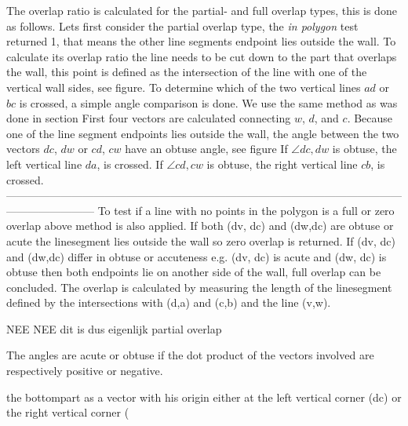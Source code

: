 \documentclass[10pt]{article}
\begin{document}
	The overlap ratio is calculated for the partial- and full overlap types, this is done as follows. 
	Lets first consider the partial overlap type, the \emph{in polygon} test returned 1, that means the other line segments endpoint lies outside the wall.
	To calculate its overlap ratio the line needs to be cut down to the part that overlaps the wall, this point is defined as the intersection of the line with one of the vertical wall sides, see figure. %
	To determine which of the two vertical lines $ad$ or $bc$ is crossed, a simple angle comparison is done.
	We use the same method as was done in section %
	First four vectors are calculated connecting $w$, $d$, and $c$.
	Because one of the line segment endpoints lies outside the wall, the angle between the two vectors $dc$, $dw$ or $cd$, $cw$ have an obtuse angle, see figure %
	If $\angle dc, dw$ is obtuse, the left vertical line $da$, is crossed. 
	If $\angle cd, cw$ is obtuse, the right vertical line $cb$, is crossed. 
------------------------------------------------------------------------------------------------------------------------------------
	To test if a line with no points in the polygon is a full or zero overlap above method is also applied.
	If both (dv, dc) and (dw,dc) are obtuse or acute the linesegment lies outside the wall so zero overlap is returned.
	If (dv, dc) and (dw,dc) differ in obtuse or accuteness e.g. (dv, dc) is acute and (dw, dc) is obtuse then 
	both endpoints lie on another side of the wall, full overlap can be concluded.
	The overlap is calculated by measuring the length of the linesegment defined by the intersections with (d,a) and (c,b) and the line (v,w).
	
	NEE NEE dit is dus eigenlijk partial overlap


	
	The angles are acute or obtuse if the dot product of the vectors involved are
	respectively positive or negative.
	
	the bottompart as a vector with his origin either at the left vertical corner (dc) or the right vertical corner (
	
\end{document}
